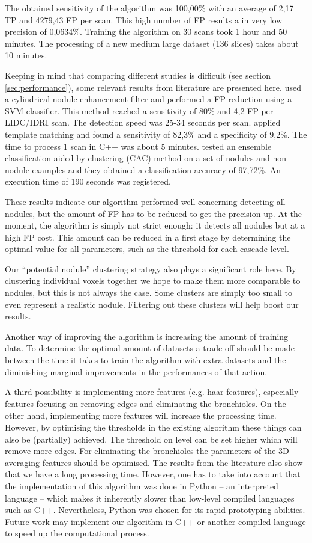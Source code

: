 The obtained sensitivity of the algorithm was 100,00\% with an average of 2,17
TP and 4279,43 FP per scan. This high number of FP results a in very low
precision of 0,0634\%. Training the algorithm on 30 scans took 1 hour and 50
minutes. The processing of a new medium large dataset (136 slices) takes about
10 minutes.

Keeping in mind that comparing different studies is difficult (see section
\ref{sec:performance}), some relevant results from literature are presented
here. \cite{teramoto} used a cylindrical nodule-enhancement filter and performed
a FP reduction using a SVM classifier. This method reached a sensitivity of 80\%
and 4,2 FP per LIDC/IDRI scan. The detection speed was 25-34 seconds per scan.
\cite{elbaz} applied template matching and found a sensitivity of 82,3\% and a
specificity of 9,2\%. The time to process 1 scan in C++ was about 5 minutes.
\cite{lee2010} tested an ensemble classification aided by clustering (CAC)
method on a set of nodules and non-nodule examples and they obtained a
classification accuracy of 97,72\%. An execution time of 190 seconds was
registered.

These results indicate our algorithm performed well concerning detecting all
nodules, but the amount of FP has to be reduced to get the precision up. At the
moment, the algorithm is simply not strict enough: it detects all nodules but at
a high FP cost. This amount can be reduced in a first stage by determining
the optimal value for all parameters, such as the threshold for each cascade
level.

Our ``potential nodule'' clustering strategy also plays a significant role here.
By clustering individual voxels together we hope to make them more comparable
to nodules, but this is not always the case. Some clusters are simply too small
to even represent a realistic nodule. Filtering out these clusters will help
boost our results.

Another way of improving the algorithm is increasing the amount of training
data. To determine the optimal amount of datasets a trade-off should be made
between the time it takes to train the algorithm with extra datasets and the
diminishing marginal improvements in the performances of that action. 

A third possibility is implementing more features (e.g. haar features),
especially features focusing on removing edges and eliminating the bronchioles.
On the other hand, implementing more features will increase the processing time.
However, by optimising the thresholds in the existing algorithm these things can
also be (partially) achieved. The threshold on level can be set higher which
will remove more edges. For eliminating the bronchioles the parameters of the 3D
averaging features should be optimised. The results from the literature also
show that we have a long processing time. However, one has to take into account
that the implementation of this algorithm was done in Python -- an interpreted
language -- which makes it inherently slower than low-level compiled languages
such as C++. Nevertheless, Python was chosen for its rapid prototyping
abilities. Future work may implement our algorithm in C++ or another compiled
language to speed up the computational process.

